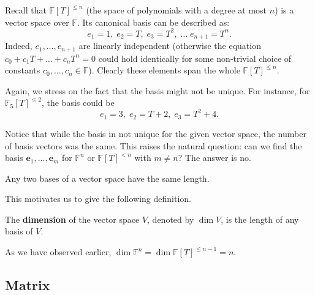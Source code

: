 \documentclass[../../book.tex]{subfiles}
\begin{document}
\begin{example}
    Recall that $\mathbb{F}[T]^{\leq n}$ (the space of polynomials with a degree at most $n$) is a vector space over $\mathbb{F}$.
    Its canonical basis can be described as:
    \begin{equation*}
        e_1 = 1, \; e_2 = T, \; e_3 = T^2, \; \dots \; e_{n+1} = T^n.
    \end{equation*}
    Indeed, $e_1,\dots,e_{n+1}$ are linearly independent (otherwise the equation $c_0+c_1T+\dots+c_nT^n=0$ could hold identically for some non-trivial choice of constants $c_0,\dots,c_n \in \mathbb{F}$).
    Clearly these elements span the whole $\mathbb{F}[T]^{\leq n}$.
\end{example}

\begin{example}
    Again, we stress on the fact that the basis might not be unique.
    For instance, for $\mathbb{F}_{5}[T]^{\leq 2}$, the basis could be 
    \begin{equation*}
        e_1 = 3, \; e_2 = T + 2, \; e_3 = T^2 + 4.
    \end{equation*}
\end{example}

Notice that while the basis in not unique for the given vector space, the number of basis vectors was the same.
This raises the natural question: can we find the basis $\mathbf{e}_1,\dots,\mathbf{e}_m$ for $\mathbb{F}^n$ or $\mathbb{F}[T]^{<n}$ with $m \neq n$?
The answer is no.

\begin{lemma}
    Any two bases of a vector space have the same length.
\end{lemma}

This motivates us to give the following definition.

\begin{definition}
    The \textbf{dimension} of the vector space $V$, denoted by $\dim V$, is the length of any basis of $V$.
\end{definition}

\begin{example}
    As we have observed earlier, $\dim \mathbb{F}^n=\dim \mathbb{F}[T]^{\leq n-1} = n$.
\end{example}

\subsection{Matrix}
\end{document}
